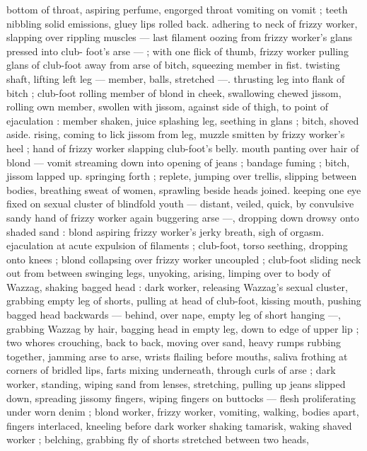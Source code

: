 bottom of throat, aspiring perfume, engorged throat vomiting on 
vomit ; teeth nibbling solid emissions, gluey lips rolled back. 
adhering to neck of frizzy worker, slapping over rippling muscles --- 
last filament oozing from frizzy worker's glans pressed into club- 
foot's arse --- ; with one flick of thumb, frizzy worker pulling glans 
of club-foot away from arse of bitch, squeezing member in fist. 
twisting shaft, lifting left leg --- member, balls, stretched ---. 
thrusting leg into flank of bitch ; club-foot rolling member of blond 
in cheek, swallowing chewed jissom, rolling own member, swollen 
with jissom, against side of thigh, to point of ejaculation : member 
shaken, juice splashing leg, seething in glans ; bitch, shoved aside. 
rising, coming to lick jissom from leg, muzzle smitten by frizzy 
worker's heel ; hand of frizzy worker slapping club-foot's belly. 
mouth panting over hair of blond --- vomit streaming down into 
opening of jeans ; bandage fuming ; bitch, jissom lapped up. 
springing forth ; replete, jumping over trellis, slipping between 
bodies, breathing sweat of women, sprawling beside heads joined. 
keeping one eye fixed on sexual cluster of blindfold youth --- 
distant, veiled, quick, by convulsive sandy hand of frizzy worker 
again buggering arse ---, dropping down drowsy onto shaded sand : 
blond aspiring frizzy worker's jerky breath, sigh of orgasm. 
ejaculation at acute expulsion of filaments ; club-foot, torso 
seething, dropping onto knees ; blond collapsing over frizzy worker 
uncoupled ; club-foot sliding neck out from between swinging legs, 
unyoking, arising, limping over to body of Wazzag, shaking bagged 
head : dark worker, releasing Wazzag's sexual cluster, grabbing 
empty leg of shorts, pulling at head of club-foot, kissing mouth, 
pushing bagged head backwards --- behind, over nape, empty leg of 
short hanging ---, grabbing Wazzag by hair, bagging head in empty 
leg, down to edge of upper lip ; two whores crouching, back to back, 
moving over sand, heavy rumps rubbing together, jamming arse to 
arse, wrists flailing before mouths, saliva frothing at corners of 
bridled lips, farts mixing underneath, through curls of arse ; dark 
worker, standing, wiping sand from lenses, stretching, pulling up 
jeans slipped down, spreading jissomy fingers, wiping fingers on 
buttocks --- flesh proliferating under worn denim ; blond worker, 
frizzy worker, vomiting, walking, bodies apart, fingers interlaced, 
kneeling before dark worker shaking tamarisk, waking shaved worker 
; belching, grabbing fly of shorts stretched between two heads, 
